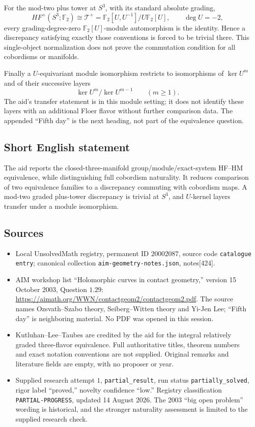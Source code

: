 \documentclass[11pt]{article}
\newcommand{\F}{\mathbb{F}}
\begin{document}
For the mod-two plus tower at \(S^3\), with its standard absolute grading,
\[
 HF^+(S^3;\F_2)\cong\mathcal T^+
       =\F_2[U,U^{-1}]/U\F_2[U],\qquad\deg U=-2,
\]
every grading-degree-zero \(\F_2[U]\)-module automorphism is the identity. Hence a discrepancy satisfying exactly those conventions is forced to be trivial there. This single-object normalization does not prove the commutation condition for all cobordisms or manifolds.

Finally a \(U\)-equivariant module isomorphism restricts to isomorphisms of \(\ker U^m\) and of their successive layers
\[
 \ker U^m/\ker U^{m-1}\qquad(m\geq1).
\]
The aid's transfer statement is in this module setting; it does not identify these layers with an additional Floer flavor without further comparison data. The appended ``Fifth day'' is the next heading, not part of the equivalence question.
\subsection{Short English statement}
The aid reports the closed-three-manifold group/module/exact-system HF--HM equivalence, while distinguishing full cobordism naturality. It reduces comparison of two equivalence families to a discrepancy commuting with cobordism maps. A mod-two graded plus-tower discrepancy is trivial at \(S^3\), and \(U\)-kernel layers transfer under a module isomorphism.
\subsection{Sources}
\begin{itemize}
\item Local UnsolvedMath registry, permanent ID \(20002087\), source code \texttt{catalogue entry}; canonical collection \texttt{aim-geometry-notes.json}, notes[424].
\item AIM workshop list ``Holomorphic curves in contact geometry,'' version 15 October 2003, Question \(1.29\): \url{https://aimath.org/WWN/contactgeom2/contactgeom2.pdf}. The source names Ozsvath--Szabo theory, Seiberg--Witten theory and Yi-Jen Lee; ``Fifth day'' is neighboring material. No PDF was opened in this session.
\item Kutluhan--Lee--Taubes are credited by the aid for the integral relatively graded three-flavor equivalence. Full authoritative titles, theorem numbers and exact notation conventions are not supplied. Original remarks and literature fields are empty, with no proposer or year.
\item Supplied research attempt \(1\), \texttt{partial\_result}, run status \texttt{partially\_solved}, rigor label ``proved,'' novelty confidence ``low.'' Registry classification \texttt{PARTIAL-PROGRESS}, updated 14 August 2026. The 2003 ``big open problem'' wording is historical, and the stronger naturality assessment is limited to the supplied research check.
\end{itemize}
\end{document}
